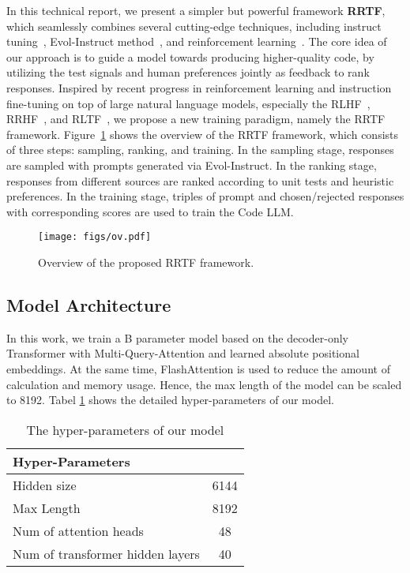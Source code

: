 \documentclass{article}
\begin{document}
In this technical report, we present a simpler but powerful framework \textbf{RRTF}, which seamlessly combines several cutting-edge techniques, including instruct tuning~\cite{instruction-2}, Evol-Instruct method~\cite{wizardlm,wizardcoder}, and reinforcement learning~\cite{rrhf}.
The core idea of our approach is to guide a model towards producing higher-quality code, by utilizing the test signals and human preferences jointly as feedback to rank responses.
Inspired by recent progress in reinforcement learning and instruction fine-tuning on top of large natural language models, especially the RLHF~\cite{instructgpt}, RRHF~\cite{rrhf}, and RLTF~\cite{rltf}, we propose a new training paradigm, namely the RRTF framework.
Figure~\ref{fig.ov} shows the overview of the RRTF framework, which consists of three steps: sampling, ranking, and training. In the sampling stage, responses are sampled with prompts generated via Evol-Instruct. In the ranking stage, responses from different sources are ranked according to unit tests and heuristic preferences. In the training stage, triples of prompt and chosen/rejected responses with corresponding scores are used to train the Code LLM.

\begin{figure}[btp]
	\centering
        \texttt{[image: figs/ov.pdf]}
	\caption{Overview of the proposed RRTF framework.}
	\label{fig.ov} 
\end{figure}

\subsection{Model Architecture}

In this work, we train a B parameter model based on the decoder-only Transformer with Multi-Query-Attention\citet{DBLP:journals/corr/abs-1911-02150} and learned absolute positional embeddings.
At the same time, FlashAttention is used to reduce the amount of calculation and memory usage.
Hence, the max length of the model can be scaled to 8192.
Tabel \ref{tab.model_architecture} shows the detailed hyper-parameters of our model.


\begin{table}[h]
	\caption{The hyper-parameters of our model}
	\centering
	\begin{tabular}{lc}
		\toprule
		Hyper-Parameters  & \makecell{Value} \\
		\midrule
            Hidden size &  6144  \\
            Max Length 	& 8192 \\
            Num of attention heads 	& 48 \\
            Num of transformer hidden layers 	&  40  \\
		\bottomrule
	\end{tabular}
	\label{tab.model_architecture}
\end{table}
\end{document}
